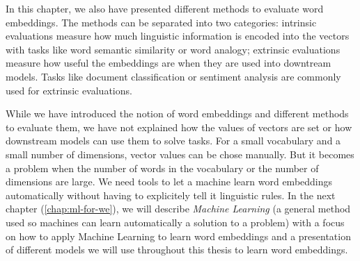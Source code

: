   In this chapter, we also have presented different methods to evaluate word
  embeddings. The methods can be separated into two categories: intrinsic
  evaluations measure how much linguistic information is encoded into the
  vectors with tasks like word semantic similarity or word analogy; extrinsic
  evaluations measure how useful the embeddings are when they are used into
  downtream models. Tasks like document classification or sentiment analysis are
  commonly used for extrinsic evaluations. \medskip

  While we have introduced the notion of word embeddings and different methods
  to evaluate them, we have not explained how the values of vectors are set or
  how downstream models can use them to solve tasks. For a small vocabulary and
  a small number of dimensions, vector values can be chose manually. But it
  becomes a problem when the number of words in the vocabulary or the number of
  dimensions are large. We need tools to let a machine learn word embeddings
  automatically without having to explicitely tell it linguistic rules. In the
  next chapter (\autoref{chap:ml-for-we}), we will describe \textit{Machine
  Learning} (a general method used so machines can learn automatically a
  solution to a problem) with a focus on how to apply Machine Learning to learn
  word embeddings and a presentation of different models we will use throughout
  this thesis to learn word embeddings.
